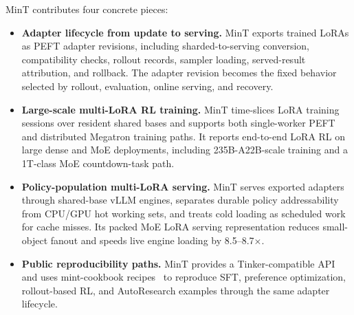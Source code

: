 \documentclass{llmxive}
\begin{document}
MinT contributes four concrete pieces:

\begin{itemize}
    \item \textbf{Adapter lifecycle from update to serving.} MinT exports trained LoRAs as PEFT adapter revisions, including sharded-to-serving conversion, compatibility checks, rollout records, sampler loading, served-result attribution, and rollback. The adapter revision becomes the fixed behavior selected by rollout, evaluation, online serving, and recovery.

    \item \textbf{Large-scale multi-LoRA RL training.} MinT time-slices LoRA training sessions over resident shared bases and supports both single-worker PEFT and distributed Megatron training paths. It reports end-to-end LoRA RL on large dense and MoE deployments, including 235B-A22B-scale training and a 1T-class MoE countdown-task path.

    \item \textbf{Policy-population multi-LoRA serving.} MinT serves exported adapters through shared-base vLLM engines, separates durable policy addressability from CPU/GPU hot working sets, and treats cold loading as scheduled work for cache misses. Its packed MoE LoRA serving representation reduces small-object fanout and speeds live engine loading by 8.5--8.7$\times$.

    \item \textbf{Public reproducibility paths.} MinT provides a Tinker-compatible API~\citep{tinker2025,tinker_cookbook} and uses mint-cookbook recipes~\citep{mint_cookbook2026} to reproduce SFT, preference optimization, rollout-based RL, and AutoResearch examples through the same adapter lifecycle.
\end{itemize}



\end{document}
